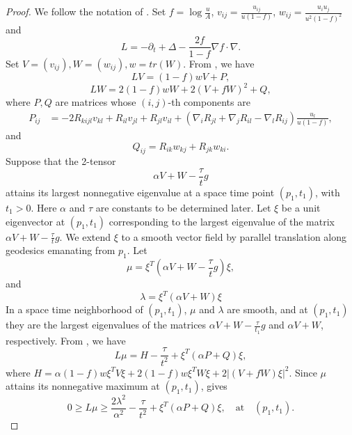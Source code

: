 \documentclass{amsart}
\theoremstyle{definition}
\theoremstyle{remark}
\numberwithin{equation}{section}
\begin{document}
\begin{proof}
We follow the notation of \cite{Han-Zhang}.
Set $f=\log \frac{u}{A}$, $v_{ij}=\frac{u_{ij}}{u(1-f)}$, $w_{ij}=\frac{u_{i}u_{j}}{u^{2}(1-f)^{2}}$ and 
$$
L=-\partial_{t}+\Delta -\frac{2f}{1-f}\nabla f\cdot \nabla.
$$
Set $V=(v_{ij}), W=(w_{ij}),w=tr(W)$.
From \cite{Han-Zhang}, we have 
\begin{equation*}
LV=(1-f)wV+P,
\end{equation*}
\begin{equation*}
LW=2(1-f)wW+2(V+fW)^{2}+Q,
\end{equation*}
where $P,Q$ are matrices whose $(i,j)$-th components are 
\begin{align}\label{Riemann P}
P_{ij}&=-2R_{kijl}v_{kl}+R_{il}v_{jl}+R_{jl}v_{il}
+(\nabla_{i}R_{jl}+\nabla_{j}R_{il}-\nabla_{l}R_{ij})\frac{u_{l}}{u(1-f)},
\end{align}
and 
\begin{equation}\label{Riemann Q}
Q_{ij}=R_{ik}w_{kj}+R_{jk}w_{ki}.
\end{equation}
Suppose that the 2-tensor 
$$
\alpha V+W-\frac{\tau}{t}g
$$
attains its largest nonnegative eigenvalue at a space time point $(p_{1},t_{1})$, with $t_{1}>0$. Here $\alpha$ and $\tau$ are constants to be determined later. Let $\xi$ be a unit eigenvector at $(p_{1},t_{1})$ corresponding to the largest eigenvalue of the matrix $\alpha V+W-\frac{\tau}{t}g$. We extend $\xi$ to a smooth vector field by parallel translation along geodesics emanating from $p_{1}$. Let
\begin{equation*}
\mu=\xi^{T}(\alpha V+W-\frac{\tau}{t}g)\xi,
\end{equation*}
and 
\begin{equation*}
\lambda=\xi^{T}(\alpha V+W)\xi
\end{equation*}
In a space time neighborhood of $(p_{1},t_{1})$, $\mu$ and $\lambda$ are smooth, and at $(p_{1},t_{1})$ they are the largest eigenvalues of the matrices $\alpha V+W-\frac{\tau}{t_1}g$ and $\alpha V+W$, respectively. From \cite{Han-Zhang}, we have 
\begin{equation}
L\mu =H-\frac{\tau}{t^{2}}+\xi^{T}(\alpha P+Q)\xi,
\end{equation}
where $H=\alpha (1-f)w\xi^{T}V\xi+2(1-f)w\xi^{T}W\xi+2|(V+fW)\xi|^{2}$.
Since $\mu$ attains its nonnegative maximum at $(p_{1},t_{1})$, \cite{Han-Zhang} gives 
\begin{equation}\label{Maximum principle}
0\geq L\mu\geq \frac{2\lambda^{2}}{\alpha^{2}}-\frac{\tau}{t^{2}}+\xi^{T}(\alpha P+Q)\xi , \quad \text{at}\quad (p_1,t_1).

\end{equation}
\end{proof}
\end{document}
